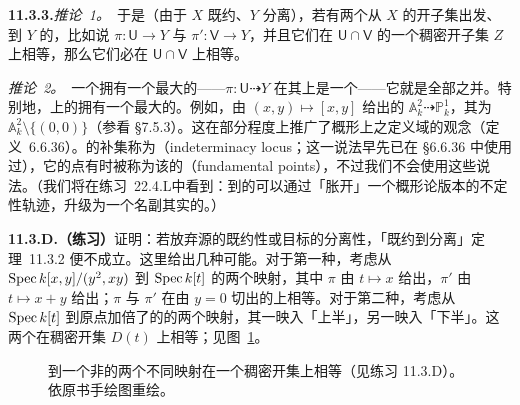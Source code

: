 \textbf{11.3.3.}\quad \emph{推论~1。}\ 于是（由于 $X$ 既约、$Y$ 分离），若有两个从 $X$ 的开子集出发、到 $Y$ 的\trMorphism，比如说 $\pi\colon\mathsf{U}\to Y$ 与 $\pi'\colon\mathsf{V}\to Y$，并且它们在 $\mathsf{U}\cap\mathsf{V}$ 的一个稠密开子集 $Z$ 上相等，那么它们必在 $\mathsf{U}\cap\mathsf{V}$ 上相等。

\emph{推论~2。}\ 一个\trRationalMap{}拥有一个最大的\trDomainOfDefinition{}——$\pi\colon\mathsf{U}\dashrightarrow Y$ 在其上是一个\trMorphism{}——它就是全部\trDomainOfDefinition{}之并。特别地，\trReduced\trScheme{}上的\trRationalFunction{}拥有一个最大的\trDomainOfDefinition。例如，由 $(x,y)\mapsto[x,y]$ 给出的\trRationalMap{} $\mathbb{A}^2_k\dashrightarrow\mathbb{P}^1_k$，其\trDomainOfDefinition{}为 $\mathbb{A}^2_k\setminus\{(0,0)\}$（参看 \S7.5.3）。这在部分程度上推广了\trLocally\trNoetherian{}概形上\trRationalFunction{}之定义域的观念（定义~6.6.36）。\trDomainOfDefinition{}的补集称为\textbf{\trIndeterminacyLocus}（indeterminacy locus；这一说法早先已在 \S6.6.36 中使用过），它的点有时被称为该\trRationalMap{}的\textbf{\trFundamentalPoint{}}（fundamental points），不过我们不会使用这些说法。（我们将在\mbox{练习~22.4.L}中看到：到\trProjectiveScheme{}的\trRationalMap{}可以通过「胀开」一个概形论版本的不定性轨迹，升级为一个名副其实的\trMorphism。）

\textbf{11.3.D.（练习）}\quad 证明：若放弃源的既约性或目标的分离性，「既约到分离」定理~11.3.2 便不成立。这里给出几种可能。对于第一种，考虑从 $\operatorname{Spec} k[x,y]/(y^2,xy)$ 到 $\operatorname{Spec} k[t]$ 的两个映射，其中 $\pi$ 由 $t\mapsto x$ 给出，$\pi'$ 由 $t\mapsto x+y$ 给出；$\pi$ 与 $\pi'$ 在由 $y=0$ 切出的\trClosedSubscheme{}上相等。对于第二种，考虑从 $\operatorname{Spec} k[t]$ 到原点加倍了的\trAffineLine{}的两个映射，其一映入「上半」，另一映入「下半」。这两个\trMorphism{}在稠密开集 $D(t)$ 上相等；见图~\ref{fig:nonseparated-agreement}。

\begin{figure}[htbp]
\centering
{}
\caption{到一个非\trSeparated{}\trScheme{}的两个不同映射在一个稠密开集上相等（见练习 11.3.D）。依原书手绘图重绘。}\label{fig:nonseparated-agreement}
\end{figure}

